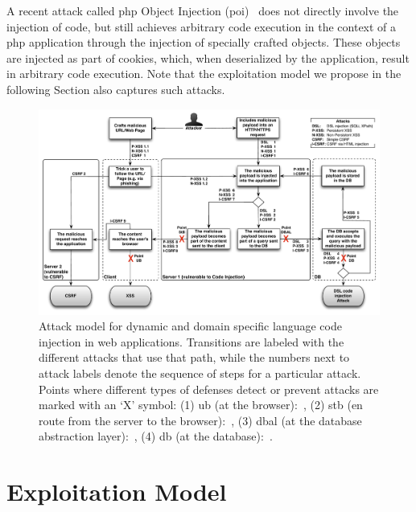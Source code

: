 \documentclass[10pt,journal,compsoc]{IEEEtran}
\begin{document}
A recent attack called {\sc php} Object Injection
({\sc poi})~\cite{DKH14} does not directly involve
the injection of code, but still achieves arbitrary code execution
in the context of a {\sc php} application through the
injection of specially crafted objects.
These objects are injected as part of cookies,
which, when deserialized
by the application, result in arbitrary code execution.
Note that the exploitation model we propose
in the following Section also captures such attacks.

\begin{figure}[t]
\begin{center}
\leavevmode
\includegraphics[scale=0.50]{attacks-steps-CSRF.pdf}
\end{center}
\caption{\label{fig:attacks}Attack model for dynamic and domain specific
language code injection in web applications.
Transitions are labeled with the different attacks that use that path,
while the numbers next to attack labels denote the 
sequence of steps for a particular attack.
Points where different types of defenses
detect or prevent attacks are marked with an `X' symbol:
(1) {\sc ub} (at the browser):~\cite{KJKV09,LV09,TNH07,NSS06,APKLM10,ML10,YCIS07,PSC09,VDDPJ11,OWVS08,DDHPJ10,VFJKKV07,SLMS14,BV08,SSM10},
(2) {\sc s}t{\sc b} (en route from the server to the browser):~\cite{RDWDE07,JKK06a,GC09,JB07,NLC07,WPLKK09,JEP08,PS11},
(3) {\sc dbal} (at the database abstraction layer):~\cite{BWS05,SW06,HCF05,XBS06,PB05,PMP11,MS09,HO05,SMS13},
(4) {\sc db} (at the database):~\cite{BK04,LLW02,VMV05}.}
\end{figure}

\section{Exploitation Model}
\label{sec:model}
\end{document}
